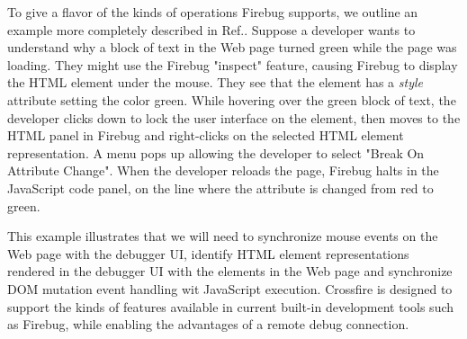 To give a flavor of the kinds of operations Firebug supports, we outline  an
example more completely described in Ref.\cite{jjb-www2010}. Suppose a developer
wants to understand why a block of text in the Web page turned green while the
page was loading. They might use the Firebug "inspect" feature, causing Firebug
to display the HTML element under the mouse. They see that the element has a
\textit{style} attribute setting the color green. While hovering over the green
block of text, the developer clicks down to lock the user interface on the
element, then moves to the HTML panel in Firebug and right-clicks on the
selected HTML element representation. A menu pops up allowing the developer to
select "Break On Attribute Change". When the developer reloads the page, Firebug
halts in the JavaScript code panel, on the line where the attribute is changed
from red to green.

This example illustrates that we will need to synchronize mouse events on the
Web page with the debugger UI, identify HTML element representations rendered in
the debugger UI with the elements in the Web page and synchronize DOM mutation
event handling wit JavaScript execution. 
Crossfire is designed to support the kinds of features available in current built-in
development tools such as Firebug, while enabling the advantages of a remote
debug connection.


